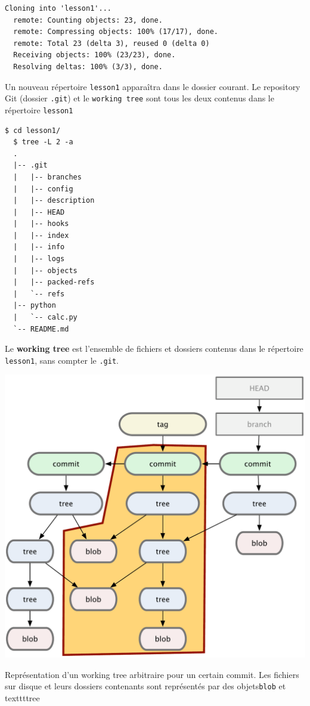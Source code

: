 \documentclass[a4paper]{../../common/tufte-latex/tufte-handout}
\begin{document}
\begin{lstlisting}[style=BashInputStyle]
  Cloning into 'lesson1'...
  remote: Counting objects: 23, done.
  remote: Compressing objects: 100% (17/17), done.
  remote: Total 23 (delta 3), reused 0 (delta 0)
  Receiving objects: 100% (23/23), done.
  Resolving deltas: 100% (3/3), done.
\end{lstlisting}

Un nouveau répertoire \texttt{lesson1} apparaîtra dans le dossier courant.
Le repository Git (dossier \texttt{.git}) et le \texttt{working tree} sont tous les deux contenus dans le répertoire \texttt{lesson1}

\begin{lstlisting}[style=BashInputStyle]
  $ cd lesson1/
  $ tree -L 2 -a 
  .
  |-- .git
  |   |-- branches
  |   |-- config
  |   |-- description
  |   |-- HEAD
  |   |-- hooks
  |   |-- index
  |   |-- info
  |   |-- logs
  |   |-- objects
  |   |-- packed-refs
  |   `-- refs
  |-- python
  |   `-- calc.py
  `-- README.md
\end{lstlisting}

Le \textbf{working tree} est l'ensemble de fichiers et dossiers contenus dans le répertoire \texttt{lesson1}, sans compter le \texttt{.git}.
\begin{marginfigure}%
  \centering
  \includegraphics[width=\linewidth]{tree.pdf}
  \label{fig:tree}
  \caption{Représentation d'un working tree arbitraire pour un certain commit. Les fichiers sur disque et leurs dossiers contenants sont représentés par des objets\texttt{blob} et texttt{tree}}
\end{marginfigure}
\end{document}
